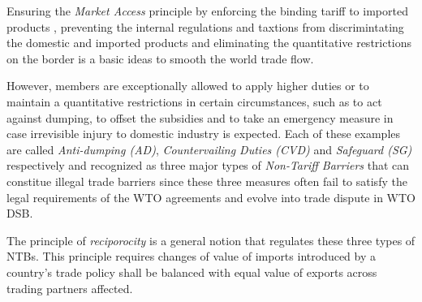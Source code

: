 Ensuring the \textit{Market Access} principle 
by enforcing
the binding tariff to imported products
, preventing the internal regulations 
and taxtions from discrimintating the domestic and imported products
and eliminating the quantitative restrictions on the border 
is a basic ideas to smooth the world trade flow. 

However, members are exceptionally allowed to apply higher duties or to maintain a quantitative restrictions in certain circumstances, such as 
to act against dumping, to offset the subsidies 
and to take an emergency measure in case irrevisible injury to domestic industry is expected. Each of these examples 
are called \textit{Anti-dumping (AD)}, \textit{Countervailing Duties (CVD)} and \textit{Safeguard (SG)} respectively and recognized as 
three major types of \textit{Non-Tariff Barriers} that can constitue illegal trade barriers 
since these three measures often fail to satisfy the legal requirements of the WTO agreements and evolve into trade dispute in WTO DSB.

The principle of \textit{reciporocity} is a general notion that regulates these three types of NTBs.
This principle requires changes of value of imports introduced by a country's trade policy 
shall be balanced with equal value of exports across trading partners affected. \citep{bagwell1999}





